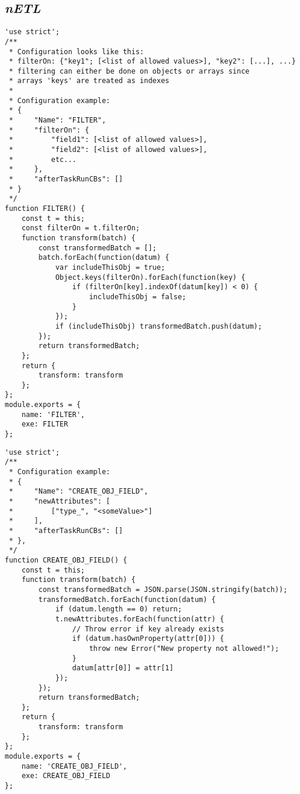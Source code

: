 \subsection{\textit{nETL}}
\label{netl-trans-fitler}
\begin{verbatim}
'use strict';
/**
 * Configuration looks like this:
 * filterOn: {"key1"; [<list of allowed values>], "key2": [...], ...}
 * filtering can either be done on objects or arrays since
 * arrays 'keys' are treated as indexes
 *
 * Configuration example:
 * {
 *     "Name": "FILTER",
 *     "filterOn": {
 *         "field1": [<list of allowed values>],
 *         "field2": [<list of allowed values>],
 *         etc...
 *     },
 *     "afterTaskRunCBs": []
 * }
 */
function FILTER() {
    const t = this;
    const filterOn = t.filterOn;
    function transform(batch) {
        const transformedBatch = [];
        batch.forEach(function(datum) {
            var includeThisObj = true;
            Object.keys(filterOn).forEach(function(key) {
                if (filterOn[key].indexOf(datum[key]) < 0) {
                    includeThisObj = false;
                }
            });
            if (includeThisObj) transformedBatch.push(datum);
        });
        return transformedBatch;
    };
    return {
        transform: transform
    };
};
module.exports = {
    name: 'FILTER',
    exe: FILTER
};
\end{verbatim}


\label{netl-trans-create-object-field}
\begin{verbatim}
'use strict';
/**
 * Configuration example:
 * {
 *     "Name": "CREATE_OBJ_FIELD",
 *     "newAttributes": [
 *         ["type_", "<someValue>"]
 *     ],
 *     "afterTaskRunCBs": []
 * },
 */
function CREATE_OBJ_FIELD() {
    const t = this;
    function transform(batch) {
        const transformedBatch = JSON.parse(JSON.stringify(batch));
        transformedBatch.forEach(function(datum) {
            if (datum.length == 0) return;
            t.newAttributes.forEach(function(attr) {
                // Throw error if key already exists
                if (datum.hasOwnProperty(attr[0])) {
                    throw new Error("New property not allowed!");
                }
                datum[attr[0]] = attr[1]
            });
        });
        return transformedBatch;
    };
    return {
        transform: transform
    };
};
module.exports = {
    name: 'CREATE_OBJ_FIELD',
    exe: CREATE_OBJ_FIELD
};
\end{verbatim}










